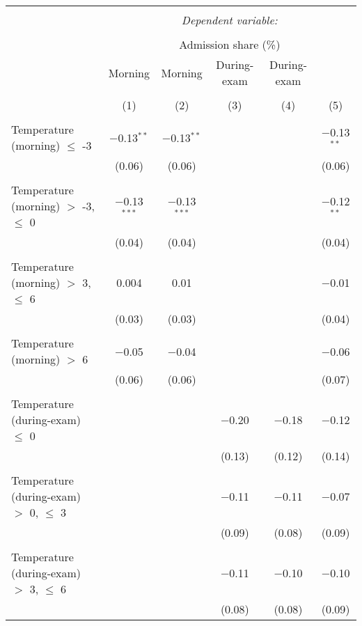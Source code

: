 
\begin{tabular}{@{\extracolsep{5pt}}lccccc} 
\\[-1.8ex]\hline 
\hline \\[-1.8ex] 
 & \multicolumn{5}{c}{\textit{Dependent variable:}} \\ 
\cline{2-6} 
\\[-1.8ex] & \multicolumn{5}{c}{Admission share (\%)} \\ 
 & Morning & Morning & During-exam & During-exam &  \\ 
\\[-1.8ex] & (1) & (2) & (3) & (4) & (5)\\ 
\hline \\[-1.8ex] 
 Temperature (morning) $\le$ -3 & $-$0.13$^{**}$ & $-$0.13$^{**}$ &  &  & $-$0.13$^{**}$ \\ 
  & (0.06) & (0.06) &  &  & (0.06) \\ 
  & & & & & \\ 
 Temperature (morning) $>$ -3, $\le$ 0 & $-$0.13$^{***}$ & $-$0.13$^{***}$ &  &  & $-$0.12$^{**}$ \\ 
  & (0.04) & (0.04) &  &  & (0.04) \\ 
  & & & & & \\ 
 Temperature (morning) $>$ 3, $\le$ 6 & 0.004 & 0.01 &  &  & $-$0.01 \\ 
  & (0.03) & (0.03) &  &  & (0.04) \\ 
  & & & & & \\ 
 Temperature (morning) $>$ 6 & $-$0.05 & $-$0.04 &  &  & $-$0.06 \\ 
  & (0.06) & (0.06) &  &  & (0.07) \\ 
  & & & & & \\ 
 Temperature (during-exam) $\le$ 0 &  &  & $-$0.20 & $-$0.18 & $-$0.12 \\ 
  &  &  & (0.13) & (0.12) & (0.14) \\ 
  & & & & & \\ 
 Temperature (during-exam) $>$ 0, $\le$ 3 &  &  & $-$0.11 & $-$0.11 & $-$0.07 \\ 
  &  &  & (0.09) & (0.08) & (0.09) \\ 
  & & & & & \\ 
 Temperature (during-exam) $>$ 3, $\le$ 6 &  &  & $-$0.11 & $-$0.10 & $-$0.10 \\ 
  &  &  & (0.08) & (0.08) & (0.09) \\ 

\end{tabular}
